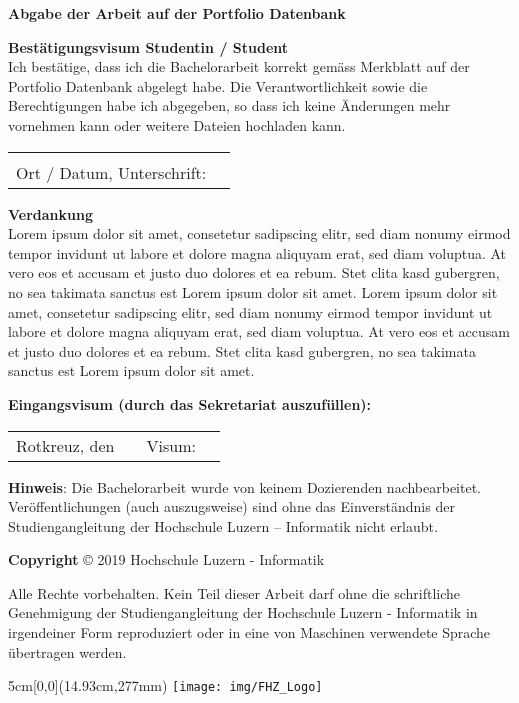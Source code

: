 \noindent
\textbf{Abgabe der Arbeit auf der Portfolio Datenbank}

\vspace{0.5em}

\noindent
\textbf{Bestätigungsvisum Studentin / Student}
\\
\noindent
Ich bestätige, dass ich die Bachelorarbeit korrekt gemäss Merkblatt auf der Portfolio Datenbank abgelegt habe. Die Verantwortlichkeit sowie die Berechtigungen habe ich abgegeben, so dass ich keine Änderungen mehr vornehmen kann oder weitere Dateien hochladen kann.

\vspace{0.7em}

\noindent
\begin{tabularx}{\textwidth}{@{}lX}
	&\\
	Ort / Datum, Unterschrift: &  \\
	\cline{2-2}
\end{tabularx}

\vspace{0.8cm}
\noindent
\textbf{Verdankung}
\\
Lorem ipsum dolor sit amet, consetetur sadipscing elitr, sed diam nonumy eirmod tempor invidunt ut labore et dolore magna aliquyam erat, sed diam voluptua. At vero eos et accusam et justo duo dolores et ea rebum. Stet clita kasd gubergren, no sea takimata sanctus est Lorem ipsum dolor sit amet. Lorem ipsum dolor sit amet, consetetur sadipscing elitr, sed diam nonumy eirmod tempor invidunt ut labore et dolore magna aliquyam erat, sed diam voluptua. At vero eos et accusam et justo duo dolores et ea rebum. Stet clita kasd gubergren, no sea takimata sanctus est Lorem ipsum dolor sit amet.

\vspace{0.8cm}
\noindent
\textbf{Eingangsvisum (durch das Sekretariat auszufüllen):}

\noindent
\renewcommand{\arraystretch}{2}
\begin{tabularx}{\textwidth}{@{}lXlX}
	Rotkreuz, den & & Visum: & \\
	\cline{2-2}
	\cline{4-4}
\end{tabularx}
\renewcommand{\arraystretch}{1}

\vfill
\noindent
\textbf{Hinweis}: Die Bachelorarbeit wurde von keinem Dozierenden nachbearbeitet. Veröffentlichungen (auch auszugsweise) sind ohne das Einverständnis der Studiengangleitung der Hochschule Luzern – Informatik nicht erlaubt.

\vspace{1em}

\noindent
\textbf{Copyright} © 2019 Hochschule Luzern - Informatik

\vspace{1em}
\noindent
Alle Rechte vorbehalten. Kein Teil dieser Arbeit darf ohne die schriftliche Genehmigung der Studiengangleitung der Hochschule Luzern - Informatik in irgendeiner Form reproduziert oder in eine von Maschinen verwendete Sprache übertragen werden.


\begin{textblock*}{5cm}[0,0](14.93cm,277mm)
	\texttt{[image: img/FHZ\_Logo]}
\end{textblock*}